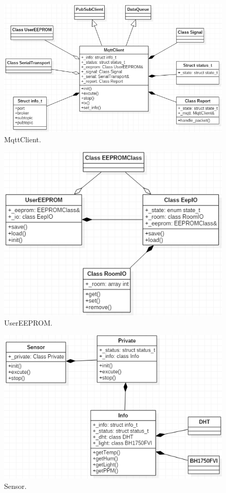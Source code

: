 \documentclass[a4paper,12pt,oneside]{article}
\begin{document}
\begin{itemize}
\begin{itemize}
\begin{figure}[H]
\centering
\includegraphics[scale=.85]{hinh/class_mqttclient.PNG}
\caption{MqttClient.}
\end{figure}

\begin{figure}[H]
\centering
\includegraphics[scale=.85]{hinh/class_usereeprom.PNG}
\caption{UserEEPROM.}
\end{figure}

\begin{figure}[H]
\centering
\includegraphics[scale=.85]{hinh/class_sensor.PNG}
\caption{Sensor.}
\end{figure}


\end{itemize}
\end{itemize}
\end{document}
